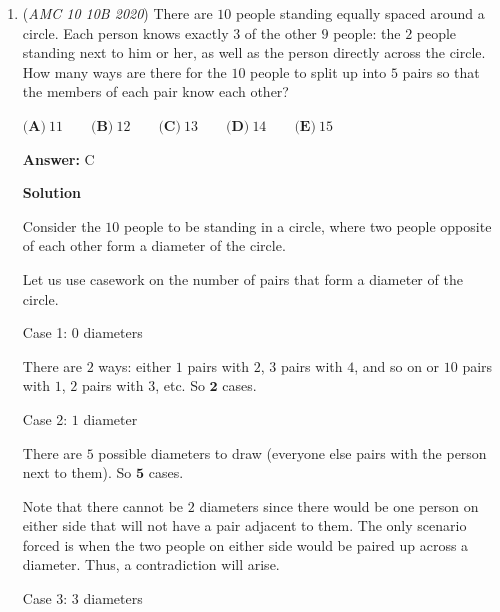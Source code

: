 \begin{enumerate}
\textbf{Solution 6 (Similar to Solution 2)}

Bela can choose the exact midpoint of the number line. Whatever Jenn does, Bela can copy her moves in the opposite side half of the number line. Jenn will always run out of space first.

 



\textbf{Solution 7}

We test whether $n$ is prime, even, or odd, and we find a winning strategy for Bela each time. We can generalize and find that with an optimal strategy, Bela will always win.

 


	\item (\textit{AMC 10 10B 2020}) There are $10$ people standing equally spaced around a circle. Each person knows exactly $3$ of the other $9$ people: the $2$ people standing next to him or her, as well as the person directly across the circle. How many ways are there for the $10$ people to split up into $5$ pairs so that the members of each pair know each other?


 $\textbf{(A)}\ 11 \qquad\textbf{(B)}\ 12 \qquad\textbf{(C)}\  13 \qquad\textbf{(D)}\ 14 \qquad\textbf{(E)}\ 15$

 \textbf{Answer: }C



\textbf{Solution}

Consider the $10$ people to be standing in a circle, where two people opposite of each other form a diameter of the circle.

 Let us use casework on the number of pairs that form a diameter of the circle.

 Case 1: $0$ diameters

 There are $2$ ways: either $1$ pairs with $2$, $3$ pairs with $4$, and so on or $10$ pairs with $1$, $2$ pairs with $3$, etc. So $\boxed{\textbf{2}}$ cases.

 Case 2: $1$ diameter

 There are $5$ possible diameters to draw (everyone else pairs with the person next to them). So $\boxed{\textbf{5}}$ cases.

 Note that there cannot be $2$ diameters since there would be one person on either side that will not have a pair adjacent to them. The only scenario forced is when the two people on either side would be paired up across a diameter. Thus, a contradiction will arise.

 Case 3: $3$ diameters


\end{enumerate}
